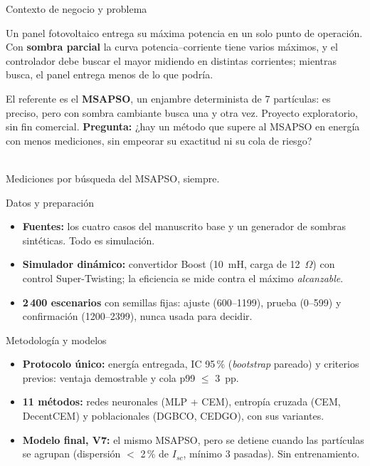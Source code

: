 \documentclass[10pt]{article}
\newcommand{\serif}{\fontfamily{bch}\selectfont}
\newcommand{\seccion}[1]{%
  \begin{tcolorbox}[colback=olive,colframe=olive,arc=0pt,
    boxrule=0pt,left=8pt,top=3pt,bottom=4pt,width=\linewidth]
    {\serif\color{white}\fontsize{30}{36}\selectfont #1}
  \end{tcolorbox}\vspace{-0.3em}}
\newcommand{\cuerpo}{\fontsize{24}{31}\selectfont}
\newcommand{\pie}[1]{{\sffamily\fontsize{18}{22}\selectfont\color{muted}#1}}
\newlength{\colh}
\begin{document}
\noindent
\begin{minipage}[t][\colh][s]{0.30\linewidth}\cuerpo\vspace{0pt}

\seccion{Contexto de negocio y problema}
Un panel fotovoltaico entrega su máxima potencia en un solo punto de operación. Con \textbf{sombra parcial} la curva potencia--corriente tiene varios máximos, y el controlador debe buscar el mayor midiendo en distintas corrientes; mientras busca, el panel entrega menos de lo que podría.

El referente es el \textbf{MSAPSO}, un enjambre determinista de 7 partículas: es preciso, pero con sombra cambiante busca una y otra vez. Proyecto exploratorio, sin fin comercial. \textbf{Pregunta:} ¿hay un método que supere al MSAPSO en energía con menos mediciones, sin empeorar su exactitud ni su cola de riesgo?

\begin{center}
  \\[2pt]
  \pie{Mediciones por búsqueda del MSAPSO, siempre.}
\end{center}

\vfill
\seccion{Datos y preparación}
\begin{itemize}[leftmargin=1.2em,itemsep=0.5em]
  \item \textbf{Fuentes:} los cuatro casos del manuscrito base y un generador de sombras sintéticas. Todo es simulación.
  \item \textbf{Simulador dinámico:} convertidor Boost (10~mH, carga de 12~$\Omega$) con control Super-Twisting; la eficiencia se mide contra el máximo \textit{alcanzable}.
  \item \textbf{2\,400 escenarios} con semillas fijas: ajuste (600--1199), prueba (0--599) y confirmación (1200--2399), nunca usada para decidir.
\end{itemize}

\vfill
\seccion{Metodología y modelos}
\begin{itemize}[leftmargin=1.2em,itemsep=0.5em]
  \item \textbf{Protocolo único:} energía entregada, IC 95\,\% (\textit{bootstrap} pareado) y criterios previos: ventaja demostrable y cola p99 $\le$ 3~pp.
  \item \textbf{11 métodos:} redes neuronales (MLP + CEM), entropía cruzada (CEM, DecentCEM) y poblacionales (DGBCO, CEDGO), con sus variantes.
  \item \textbf{Modelo final, V7:} el mismo MSAPSO, pero se detiene cuando las partículas se agrupan (dispersión $<$ 2\,\% de $I_{sc}$, mínimo 3 pasadas). Sin entrenamiento.
\end{itemize}

\end{minipage}\hfill
\end{document}
